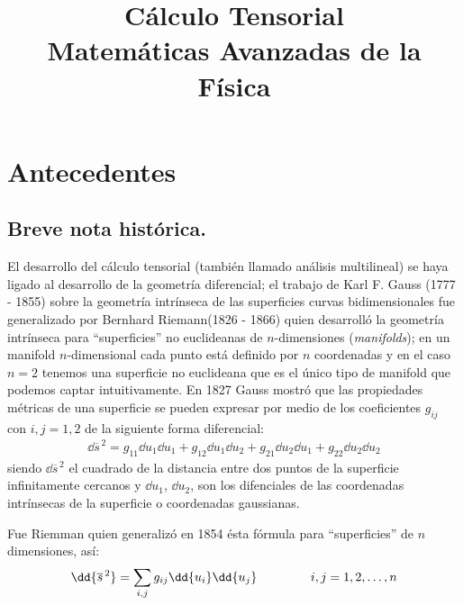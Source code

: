  
\author{}
\title{Cálculo Tensorial\\ {\large Matemáticas Avanzadas de la Física}\vspace{-1.5\baselineskip}}
\date{ }

\maketitle
\fontsize{14}{14}\selectfont

\chapter{Antecedentes}

\section{Breve nota histórica.}
El desarrollo del cálculo tensorial (también llamado análisis multilineal) se haya ligado al desarrollo de la geometría diferencial; el trabajo de Karl F. Gauss (1777 - 1855) sobre la geometría intrínseca de las superficies curvas bidimensionales fue generalizado por Bernhard Riemann(1826 - 1866) quien desarrolló la geometría intrínseca para \enquote{superficies} no euclideanas de $n$-dimensiones (\emph{manifolds}); en un manifold $n$-dimensional cada punto está definido por $n$ coordenadas y en el caso $n = 2$ tenemos una superficie no euclideana que es el único tipo de manifold que podemos captar intuitivamente. En 1827 Gauss mostró que las propiedades métricas de una superficie se pueden expresar por medio de los coeficientes $g_{ij}$ con $i, j =1, 2$ de la siguiente forma diferencial:
\begin{align*}
\dd{\overline{s}^{\, 2}} = g_{11} \dd{u_{1}} \dd{u_{1}} + g_{12} \dd{u_{1}} \dd{u_{2}} + g_{21} \dd{u_{2}} \dd{u_{1}} + g_{22} \dd{u_{2}} \dd{u_{2}}
\end{align*}
siendo $\dd{\overline{s}^{\, 2}}$ el cuadrado de la distancia entre dos puntos de la superficie infinitamente cercanos y $\dd{u_{1}}$, $\dd{u_{2}}$, son los difenciales de las coordenadas intrínsecas de la superficie o coordenadas gaussianas.
\par
Fue Riemman quien generalizó en 1854 ésta fórmula para \enquote{superficies} de $n$ dimensiones, así:
\begin{align*}
\dd{\overline{s}^{\, 2}} = \sum_{i, j} g_{ij} \dd{u_{i}} \dd{u_{j}} \hspace{1.5cm} i, j = 1, 2, \ldots, n
\end{align*}
